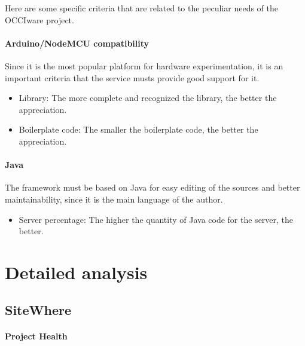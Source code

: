 \documentclass{article}
\begin{document}
Here are some specific criteria that are related to the peculiar needs of the OCCIware project.

\paragraph{Arduino/NodeMCU compatibility} Since it is the most popular platform for hardware experimentation, it is an important criteria that the service musts provide good support for it.

\begin{itemize}
\item Library: The more complete and recognized the library, the better the appreciation.
\item Boilerplate code: The smaller the boilerplate code, the better the appreciation.
\end{itemize}

\paragraph{Java} The framework must be based on Java for easy editing of the sources and better maintainability, since it is the main language of the author.

\begin{itemize}
\item Server percentage: The higher the quantity of Java code for the server, the better.
\end{itemize}

\section{Detailed analysis}

\subsection{SiteWhere}

\paragraph{Project Health}
\end{document}
